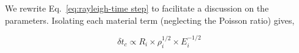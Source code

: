 We rewrite Eq.~\ref{eq:rayleigh-time step} to facilitate a discussion on the parameters. Isolating each material term (neglecting the Poisson ratio) gives, 

\begin{equation}
	\delta t_c \propto R_i \times \rho_i^{1/2} \times E_i^{-1/2}
\end{equation}








